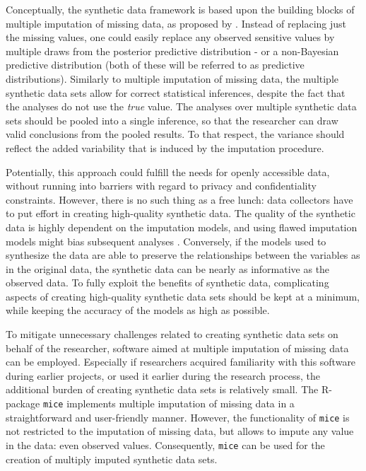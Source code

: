 \documentclass[psych,article,submit,moreauthors,pdftex]{mdpi}
\begin{document}
Conceptually, the synthetic data framework is based upon the building
blocks of multiple imputation of missing data, as proposed by
\citet{rubin_multiple_1987}. Instead of replacing just the missing
values, one could easily replace any observed sensitive values by
multiple draws from the posterior predictive distribution - or a
non-Bayesian predictive distribution (both of these will be referred to
as predictive distributions). Similarly to multiple imputation of
missing data, the multiple synthetic data sets allow for correct
statistical inferences, despite the fact that the analyses do not use
the \emph{true} value. The analyses over multiple synthetic data sets
should be pooled into a single inference, so that the researcher can
draw valid conclusions from the pooled results. To that respect, the
variance should reflect the added variability that is induced by the
imputation procedure.

Potentially, this approach could fulfill the needs for openly accessible
data, without running into barriers with regard to privacy and
confidentiality constraints. However, there is no such thing as a free
lunch: data collectors have to put effort in creating high-quality
synthetic data. The quality of the synthetic data is highly dependent on
the imputation models, and using flawed imputation models might bias
subsequent analyses
\citep{reiter2004simultaneous, grund2021using, jiang2021balancing}.
Conversely, if the models used to synthesize the data are able to
preserve the relationships between the variables as in the original
data, the synthetic data can be nearly as informative as the observed
data. To fully exploit the benefits of synthetic data, complicating
aspects of creating high-quality synthetic data sets should be kept at a
minimum, while keeping the accuracy of the models as high as possible.

To mitigate unnecessary challenges related to creating synthetic data
sets on behalf of the researcher, software aimed at multiple imputation
of missing data can be employed. Especially if researchers acquired
familiarity with this software during earlier projects, or used it
earlier during the research process, the additional burden of creating
synthetic data sets is relatively small. The R-package \texttt{mice}
\citep{mice} implements multiple imputation of missing data in a
straightforward and user-friendly manner. However, the functionality of
\texttt{mice} is not restricted to the imputation of missing data, but
allows to impute any value in the data: even observed values.
Consequently, \texttt{mice} can be used for the creation of multiply
imputed synthetic data sets.
\end{document}
